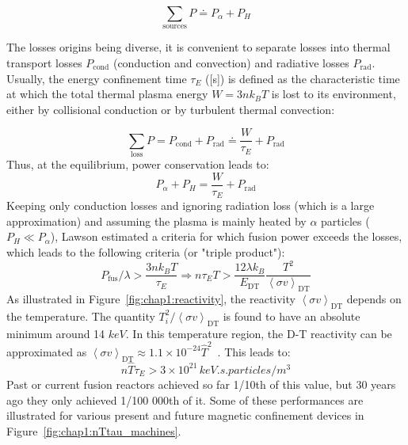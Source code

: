 \begin{equation}
\sum_{\mathrm{sources}} P
	\doteq 
	P_\alpha + P_{H} 
	\label{eq:sources}
\end{equation}

The losses origins being diverse, it is convenient to separate losses into thermal transport losses $P_{\mathrm{cond}}$ (conduction and convection) and radiative losses $P_{\mathrm{rad}}$. Usually, the energy confinement time $\tau_E$ ([\si{s}]) is defined as the characteristic time at which the total thermal plasma energy $W=3 n k_B T$ is lost to its environment, either by collisional conduction or by turbulent thermal convection:

\begin{equation}
\sum_{\mathrm{loss}} P 
	=
	P_{\mathrm{cond}} + P_{\mathrm{rad}}
	\doteq 
	\frac{ W }{ \tau_E } + P_{\mathrm{rad}}
	\label{eq:losses}
\end{equation}
Thus, at the equilibrium, power conservation leads to:
\begin{equation}
P_\alpha + P_{H} = \frac{ W }{ \tau_E } + P_{\mathrm{rad}}
\end{equation}
Keeping only conduction losses and ignoring radiation loss (which is a large approximation) and assuming the plasma is mainly heated by $\alpha$ particles ($P_H\ll P_\alpha$), Lawson estimated a criteria for which fusion power exceeds the losses, which leads to the following criteria (or "triple product"):
\begin{equation*}
	P_{\mathrm{fus}}/\lambda > \frac{3n k_B T}{\tau_E}
	\Rightarrow
	n \tau_E T > 
		\frac{12 \lambda k_B}{E_{\mathrm{DT}}} 
		\frac{T^2}{\left<\sigma v \right>_{\mathrm{DT}}}
\end{equation*}
As illustrated in Figure~\ref{fig:chap1:reactivity}, the reactivity $\left<\sigma v \right>_{\mathrm{DT}}$ depends on the temperature. The quantity $T_i^2 / \left<\sigma v \right>_{\mathrm{DT}}$ is found to have an absolute minimum around 14 $\si{keV}$. In this temperature region, the D-T reactivity can be approximated as $\left<\sigma v \right>_{\mathrm{DT}}\approx 1.1\times10^{-24} \hat{T}^2$~. 
This leads to:
\begin{equation}	
	n \hat{T} \tau_E > 3\times 10^{21} \, \si{keV.s.particles/m^3}
	\label{eq:lawson_criteria}
\end{equation}
Past or current fusion reactors achieved so far 1/10th of this value, but 30 years ago they only achieved 1/100 000th of it. Some of these performances are illustrated for various present and future magnetic confinement devices in Figure~\ref{fig:chap1:nTtau_machines}.



